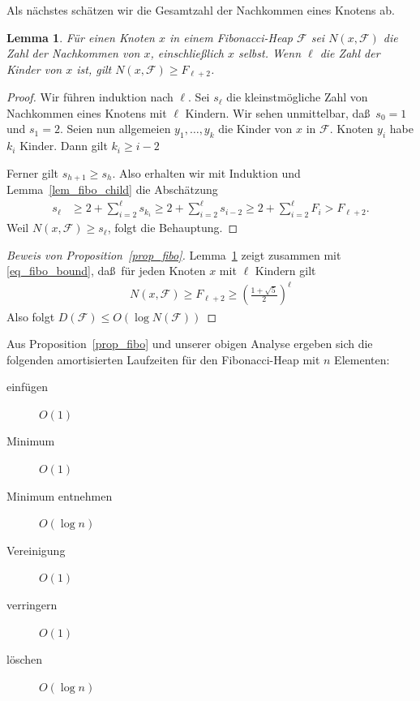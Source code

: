 \documentclass[10pt,reqno]{amsart}
\numberwithin{equation}{section}
\newcommand\cF{\mathcal F}
\newtheorem{lemma}[definition]{Lemma}
\newcommand\bc[1]{\left({#1}\right)}
\newcommand\bcfr[2]{\bc{\frac{#1}{#2}}}
\newcommand\Lem{Lemma}
\newcommand\Prop{Proposition}
\begin{document}
Als n\"achstes sch\"atzen wir die Gesamtzahl der Nachkommen eines Knotens ab.
				
		\begin{lemma}\label{lem_fibo_succ}
			F\"ur einen Knoten $x$ in einem Fibonacci-Heap $\cF$ sei $N(x,\cF)$ die Zahl der Nachkommen von $x$, einschlie\ss lich $x$ selbst. Wenn $\ell$ die Zahl der Kinder von $x$ ist, gilt $ N(x,\cF)\geq F_{\ell+2} $.
		\end{lemma}
		\begin{proof}
				Wir f\"uhren induktion nach $\ell$.
				Sei $s_\ell$ die kleinstm\"ogliche Zahl von Nachkommen eines Knotens mit $\ell$ Kindern.
				Wir sehen unmittelbar, da\ss\ $s_0=1$ und $s_1=2$.
				Seien nun allgemeien $y_1,\ldots,y_k$ die Kinder von $x$ in $\cF$.
				Knoten $y_i$ habe $k_i$ Kinder.
				Dann gilt $k_i\geq i-2$

				Ferner gilt $s_{h+1}\geq s_h$.
				Also erhalten wir mit Induktion und \Lem~\ref{lem_fibo_child} die Absch\"atzung
					\begin{align*}
						s_\ell&\geq2+\sum_{i=2}^\ell s_{k_i}\geq2+\sum_{i=2}^\ell s_{i-2}\geq2+\sum_{i=2}^\ell F_{i}>F_{\ell+2}.
					\end{align*}
				Weil $N(x,\cF)\geq s_\ell$, folgt die Behauptung.
		\end{proof}

		\begin{proof}[Beweis von \Prop~\ref{prop_fibo}]

			Lemma~\ref{lem_fibo_succ} zeigt zusammen mit \eqref{eq_fibo_bound}, da\ss\ f\"ur jeden Knoten $x$ mit $\ell$ Kindern gilt
					\begin{align*}
						N(x,\cF)\geq F_{\ell+2}\geq\bcfr{1+\sqrt 5}2^\ell
					\end{align*}
			Also folgt $D(\cF)\leq O(\log N(\cF))$
		\end{proof}

		Aus \Prop~\ref{prop_fibo} und unserer obigen Analyse ergeben sich die folgenden amortisierten Laufzeiten f\"ur den Fibonacci-Heap mit $n$ Elementen:
			\begin{description}
				\item[einf\"ugen] $O(1)$
				\item[Minimum] $O(1)$
				\item[Minimum entnehmen] $O(\log n)$
				\item[Vereinigung] $O(1)$
				\item[verringern] $O(1)$
				\item[l\"oschen] $O(\log n)$
			\end{description}
\end{document}

